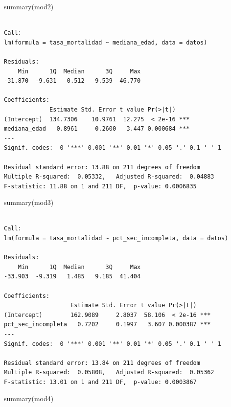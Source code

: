 \documentclass[
  spanish,
  a4paper,
]{scrbook}
\newenvironment{Shaded}{\begin{snugshade}}{\end{snugshade}}
\newcommand{\FunctionTok}[1]{\textcolor[rgb]{0.28,0.35,0.67}{#1}}
\newcommand{\NormalTok}[1]{\textcolor[rgb]{0.00,0.23,0.31}{#1}}
\begin{document}
\begin{Shaded}
\begin{Highlighting}[]
\FunctionTok{summary}\NormalTok{(mod2)}
\end{Highlighting}
\end{Shaded}

\begin{verbatim}

Call:
lm(formula = tasa_mortalidad ~ mediana_edad, data = datos)

Residuals:
    Min      1Q  Median      3Q     Max 
-31.870  -9.631   0.512   9.539  46.770 

Coefficients:
             Estimate Std. Error t value Pr(>|t|)    
(Intercept)  134.7306    10.9761  12.275  < 2e-16 ***
mediana_edad   0.8961     0.2600   3.447 0.000684 ***
---
Signif. codes:  0 '***' 0.001 '**' 0.01 '*' 0.05 '.' 0.1 ' ' 1

Residual standard error: 13.88 on 211 degrees of freedom
Multiple R-squared:  0.05332,   Adjusted R-squared:  0.04883 
F-statistic: 11.88 on 1 and 211 DF,  p-value: 0.0006835
\end{verbatim}

\begin{Shaded}
\begin{Highlighting}[]
\FunctionTok{summary}\NormalTok{(mod3)}
\end{Highlighting}
\end{Shaded}

\begin{verbatim}

Call:
lm(formula = tasa_mortalidad ~ pct_sec_incompleta, data = datos)

Residuals:
    Min      1Q  Median      3Q     Max 
-33.903  -9.319   1.485   9.185  41.404 

Coefficients:
                   Estimate Std. Error t value Pr(>|t|)    
(Intercept)        162.9089     2.8037  58.106  < 2e-16 ***
pct_sec_incompleta   0.7202     0.1997   3.607 0.000387 ***
---
Signif. codes:  0 '***' 0.001 '**' 0.01 '*' 0.05 '.' 0.1 ' ' 1

Residual standard error: 13.84 on 211 degrees of freedom
Multiple R-squared:  0.05808,   Adjusted R-squared:  0.05362 
F-statistic: 13.01 on 1 and 211 DF,  p-value: 0.0003867
\end{verbatim}

\begin{Shaded}
\begin{Highlighting}[]
\FunctionTok{summary}\NormalTok{(mod4)}
\end{Highlighting}
\end{Shaded}
\end{document}
